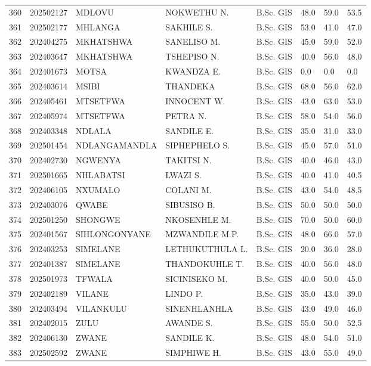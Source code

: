 \documentclass[12pt]{article}
\begin{document}
\begin{longtable}{@{}llllllll@{}}
360 & 202502127 & MDLOVU & NOKWETHU N. & B.Sc. GIS & 48.0 & 59.0 & 53.5 \\
361 & 202502177 & MHLANGA & SAKHILE S. & B.Sc. GIS & 53.0 & 41.0 & 47.0 \\
362 & 202404275 & MKHATSHWA & SANELISO M. & B.Sc. GIS & 45.0 & 59.0 & 52.0 \\
363 & 202403647 & MKHATSHWA & TSHEPISO N. & B.Sc. GIS & 40.0 & 56.0 & 48.0 \\
364 & 202401673 & MOTSA & KWANDZA E. & B.Sc. GIS & 0.0 & 0.0 & 0.0 \\
365 & 202403614 & MSIBI & THANDEKA & B.Sc. GIS & 68.0 & 56.0 & 62.0 \\
366 & 202405461 & MTSETFWA & INNOCENT W. & B.Sc. GIS & 43.0 & 63.0 & 53.0 \\
367 & 202405974 & MTSETFWA & PETRA N. & B.Sc. GIS & 58.0 & 54.0 & 56.0 \\
368 & 202403348 & NDLALA & SANDILE E. & B.Sc. GIS & 35.0 & 31.0 & 33.0 \\
369 & 202501454 & NDLANGAMANDLA & SIPHEPHELO S. & B.Sc. GIS & 45.0 & 57.0 & 51.0 \\
370 & 202402730 & NGWENYA & TAKITSI N. & B.Sc. GIS & 40.0 & 46.0 & 43.0 \\
371 & 202501665 & NHLABATSI & LWAZI S. & B.Sc. GIS & 40.0 & 41.0 & 40.5 \\
372 & 202406105 & NXUMALO & COLANI M. & B.Sc. GIS & 43.0 & 54.0 & 48.5 \\
373 & 202403076 & QWABE & SIBUSISO B. & B.Sc. GIS & 50.0 & 50.0 & 50.0 \\
374 & 202501250 & SHONGWE & NKOSENHLE M. & B.Sc. GIS & 70.0 & 50.0 & 60.0 \\
375 & 202401567 & SIHLONGONYANE & MZWANDILE M.P. & B.Sc. GIS & 48.0 & 66.0 & 57.0 \\
376 & 202403253 & SIMELANE & LETHUKUTHULA L. & B.Sc. GIS & 20.0 & 36.0 & 28.0 \\
377 & 202401387 & SIMELANE & THANDOKUHLE T. & B.Sc. GIS & 40.0 & 56.0 & 48.0 \\
378 & 202501973 & TFWALA & SICINISEKO M. & B.Sc. GIS & 40.0 & 50.0 & 45.0 \\
379 & 202402189 & VILANE & LINDO P. & B.Sc. GIS & 35.0 & 43.0 & 39.0 \\
380 & 202403494 & VILANKULU & SINENHLANHLA & B.Sc. GIS & 43.0 & 49.0 & 46.0 \\
381 & 202402015 & ZULU & AWANDE S. & B.Sc. GIS & 55.0 & 50.0 & 52.5 \\
382 & 202406130 & ZWANE & SANDILE K. & B.Sc. GIS & 48.0 & 54.0 & 51.0 \\
383 & 202502592 & ZWANE & SIMPHIWE H. & B.Sc. GIS & 43.0 & 55.0 & 49.0 \\

\end{longtable}
\end{document}
